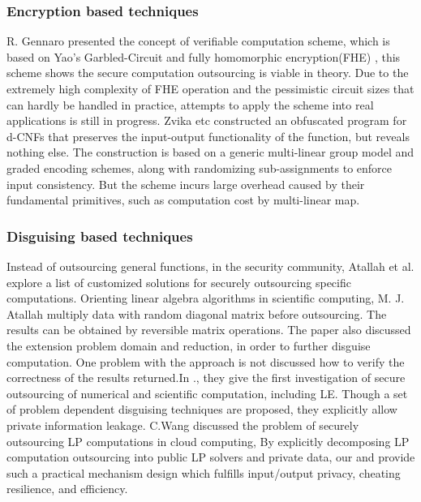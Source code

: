 \documentclass[runningheads,a4paper]{llncs}
\begin{document}
\subsubsection{Encryption based techniques}
R. Gennaro \cite{t16}presented the concept of verifiable computation scheme, which is based on Yao’s Garbled-Circuit and fully homomorphic encryption(FHE)\cite{t15} , this scheme shows the secure computation outsourcing is viable in theory. Due to the extremely high complexity of FHE operation and the pessimistic circuit sizes that can hardly be handled in practice, attempts to apply the scheme into real applications is still in progress.
Zvika \cite{t10}etc constructed an obfuscated program for d-CNFs that preserves the input-output functionality of the function, but reveals nothing else. The construction is based on a generic multi-linear group model and graded encoding schemes, along with randomizing sub-assignments to enforce input consistency. But the scheme incurs large overhead caused by their fundamental primitives, such as computation cost by multi-linear map.
\subsubsection{Disguising based techniques}
Instead of outsourcing general functions, in the security community, Atallah et al. explore a list of customized solutions \cite{t19}\cite{t20}\cite{t21}\cite{t22} for securely outsourcing specific computations. Orienting linear algebra algorithms in scientific computing, M. J. Atallah\cite{t19} multiply data with random diagonal matrix before outsourcing. The results can be obtained by reversible matrix operations. The paper also discussed the extension problem domain and reduction, in order to further disguise computation. One problem with the approach is not discussed how to verify the correctness of the results returned.In \cite{t20}., they give the first investigation of secure outsourcing of numerical and scientific computation, including LE. Though a set of problem dependent disguising techniques are proposed, they explicitly allow private information leakage.
C.Wang\cite{t5} discussed the problem of securely outsourcing LP computations in cloud computing, By explicitly decomposing LP computation outsourcing into public LP solvers and private data, our 
and provide such a practical mechanism design which fulfills input/output privacy, cheating resilience, and efficiency.
% 
\end{document}
